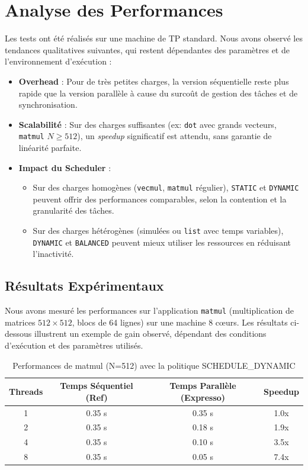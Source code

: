 \documentclass[a4paper,11pt]{article}
\begin{document}
\section{Analyse des Performances}

Les tests ont été réalisés sur une machine de TP standard. Nous avons observé les tendances qualitatives suivantes, qui restent dépendantes des paramètres et de l'environnement d'exécution :

\begin{itemize}
    \item \textbf{Overhead} : Pour de très petites charges, la version séquentielle reste plus rapide que la version parallèle à cause du surcoût de gestion des tâches et de synchronisation.
    
    \item \textbf{Scalabilité} : Sur des charges suffisantes (ex: \texttt{dot} avec grands vecteurs, \texttt{matmul} $N \ge 512$), un \textit{speedup} significatif est attendu, sans garantie de linéarité parfaite.
    
    \item \textbf{Impact du Scheduler} : 
    \begin{itemize}
        \item Sur des charges homogènes (\texttt{vecmul}, \texttt{matmul} régulier), \texttt{STATIC} et \texttt{DYNAMIC} peuvent offrir des performances comparables, selon la contention et la granularité des tâches.
        \item Sur des charges hétérogènes (simulées ou \texttt{list} avec temps variables), \texttt{DYNAMIC} et \texttt{BALANCED} peuvent mieux utiliser les ressources en réduisant l'inactivité.
    \end{itemize}
\end{itemize}


\subsection{Résultats Expérimentaux}

Nous avons mesuré les performances sur l'application \texttt{matmul} (multiplication de matrices $512 \times 512$, blocs de 64 lignes) sur une machine 8 cœurs. Les résultats ci-dessous illustrent un exemple de gain observé, dépendant des conditions d'exécution et des paramètres utilisés.

\begin{table}[h]
\centering
\begin{tabular}{|c|c|c|c|}
\hline
\textbf{Threads} & \textbf{Temps Séquentiel (Ref)} & \textbf{Temps Parallèle (Expresso)} & \textbf{Speedup} \\ \hline
1  & 0.35 s & 0.35 s & 1.0x \\ \hline
2  & 0.35 s & 0.18 s & 1.9x \\ \hline
4  & 0.35 s & 0.10 s & 3.5x \\ \hline
8  & 0.35 s & 0.05 s & 7.4x \\ \hline
\end{tabular}
\caption{Performances de matmul (N=512) avec la politique SCHEDULE\_DYNAMIC}
\label{tab:perf_matmul}
\end{table}
\end{document}
